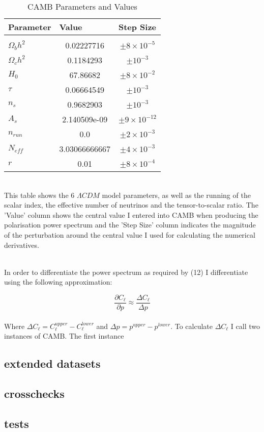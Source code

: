 \begin{table}[h]
\centering
\caption{CAMB Parameters and Values}
\label{my-label}
\begin{tabular}{l|l|l}
Parameter & Value & Step Size \\ \hline
& \multicolumn{1}{c|}{} & \multicolumn{1}{c}{} \\
$\Omega_{b}h^{2}$ & \multicolumn{1}{c|}{0.02227716} & \multicolumn{1}{c}{$\pm 8 \times 10^{-5}$} \\
$\Omega_{c}h^{2}$ & \multicolumn{1}{c|}{0.1184293} & \multicolumn{1}{c}{$\pm 10^{-3}$} \\
$H_0$ & \multicolumn{1}{c|}{67.86682} & \multicolumn{1}{c}{$\pm 8 \times 10^{-2}$} \\
$\tau$ & \multicolumn{1}{c|}{0.06664549} & \multicolumn{1}{c}{$\pm 10^{-3}$} \\
$n_s$ & \multicolumn{1}{c|}{0.9682903} & \multicolumn{1}{c}{$\pm 10^{-3}$} \\
$A_s$ & \multicolumn{1}{c|}{2.140509e-09} & \multicolumn{1}{c}{$\pm 9 \times 10^{-12}$} \\
$n_{run}$ & \multicolumn{1}{c|}{0.0} & \multicolumn{1}{c}{$\pm 2 \times 10^{-3}$} \\
$N_{eff}$ & \multicolumn{1}{c|}{3.03066666667} & \multicolumn{1}{c}{$\pm 4 \times 10^{-3}$} \\
$r$ & \multicolumn{1}{c|}{0.01} & \multicolumn{1}{c}{$\pm 8 \times 10^{-4}$} \\
\end{tabular}
\bigskip
\\This table shows the 6 $\Lambda CDM$ model parameters, as well as the running of the scalar index, the effective number of neutrinos and the tensor-to-scalar ratio. The 'Value' column shows the central value I entered into CAMB when producing the polarisation power spectrum and the 'Step Size' column indicates the magnitude of the perturbation around the central value I used for calculating the numerical derivatives.
\end{table}
\\
In order to differentiate the power spectrum as required by (12) I differentiate using the following approximation:

\begin{equation}
\frac{\partial C_{\ell}}{\partial p} \approx \frac{\Delta C_{\ell}}{\Delta p}
\end{equation}
\\
Where $\Delta C_{\ell} = C^{upper}_{\ell} - C^{lower}_{\ell}$ and $\Delta p = p^{upper} - p^{lower}$. To calculate $\Delta C_{\ell}$ I call two instances of CAMB. The first instance

\subsection{extended datasets}
\subsection{crosschecks}
\subsection{tests}
